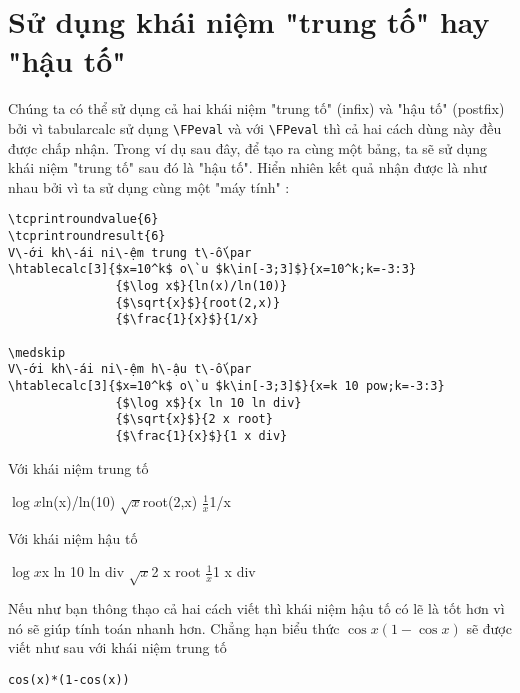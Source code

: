 \documentclass[a4paper,10pt]{article}
\newcommand\tbcalc{\textsf{tabularcalc}\xspace}
\newcommand\mywidth{0.85\linewidth}
\begin{document}
\section{Sử dụng khái niệm "trung tố" hay "hậu tố"}
Chúng ta có thể sử dụng cả hai khái niệm "trung tố" (infix) và "hậu tố" (postfix) bởi vì \tbcalc sử dụng \verb=\FPeval= và với \verb=\FPeval= thì cả hai cách dùng này đều được chấp nhận. Trong ví dụ sau đây, để tạo ra cùng một bảng, ta sẽ sử dụng khái niệm "trung tố" sau đó là "hậu tố". Hiển nhiên kết quả nhận được là như nhau bởi vì ta sử dụng cùng một "máy tính" :
\begin{center}
\begin{minipage}{\mywidth}
\begin{lstlisting}
\tcprintroundvalue{6}
\tcprintroundresult{6}
V\-ới kh\-ái ni\-ệm trung t\-ố\par
\htablecalc[3]{$x=10^k$ o\`u $k\in[-3;3]$}{x=10^k;k=-3:3}
               {$\log x$}{ln(x)/ln(10)}
               {$\sqrt{x}$}{root(2,x)}
               {$\frac{1}{x}$}{1/x}

\medskip
V\-ới kh\-ái ni\-ệm h\-ậu t\-ố\par
\htablecalc[3]{$x=10^k$ o\`u $k\in[-3;3]$}{x=k 10 pow;k=-3:3}
               {$\log x$}{x ln 10 ln div}
               {$\sqrt{x}$}{2 x root}
               {$\frac{1}{x}$}{1 x div}
\end{lstlisting}
\end{minipage}

Với khái niệm trung tố\par\par\nobreak
{}
               {$\log x$}{ln(x)/ln(10)}
               {$\sqrt{x}$}{root(2,x)}
               {$\frac{1}{x}$}{1/x}

\medskip
Với khái niệm hậu tố\par\par
{}
               {$\log x$}{x ln 10 ln div}
               {$\sqrt{x}$}{2 x root}
               {$\frac{1}{x}$}{1 x div}
\end{center}
Nếu như bạn thông thạo cả hai cách viết thì khái niệm hậu tố có lẽ là tốt hơn vì nó sẽ giúp tính toán nhanh hơn. Chẳng hạn biểu thức $\cos x(1-\cos x)$ sẽ được viết như sau với khái niệm trung tố
\begin{center}
\begin{minipage}{\mywidth}
\begin{lstlisting}
cos(x)*(1-cos(x))
\end{lstlisting}
\end{minipage}
\end{center} 
\end{document}

